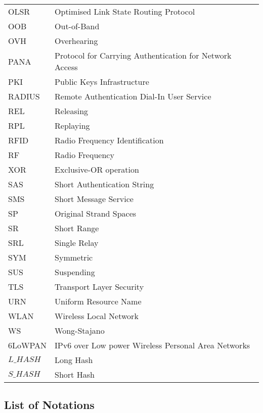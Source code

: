 \begin{longtable}[l]{p{50pt} p{270pt}}
OLSR & Optimised Link State Routing Protocol \\
OOB & Out-of-Band \\ 
OVH & Overhearing \\
PANA & Protocol for Carrying Authentication for Network Access\\
PKI &  Public Keys Infrastructure \\
RADIUS & Remote Authentication Dial-In User Service  \\
REL & Releasing\\
RPL & Replaying \\
RFID & Radio Frequency Identification \\
RF & Radio Frequency \\
XOR & Exclusive-OR operation \\ 
SAS & Short Authentication String \\
SMS & Short Message Service \\
SP & Original Strand Spaces \\
SR & Short Range \\
SRL & Single Relay \\
SYM & Symmetric\\
SUS & Suspending \\
TLS & Transport Layer Security \\
URN & Uniform Resource Name\\ 
WLAN & Wireless Local Network\\
WS &  Wong-Stajano \\
6LoWPAN & IPv6 over Low power Wireless Personal Area Networks \\
$L\_HASH$ & Long Hash \\
$S\_HASH$ & Short Hash \\
\end{longtable} 

\subsection*{List of Notations}

